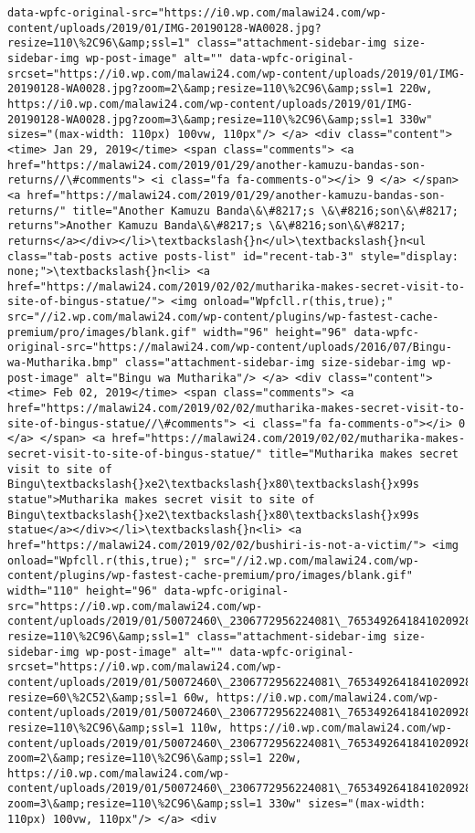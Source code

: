 \documentclass[11pt]{article}
\begin{document}
\begin{Verbatim}[commandchars=\\\{\}]
data-wpfc-original-src="https://i0.wp.com/malawi24.com/wp-content/uploads/2019/01/IMG-20190128-WA0028.jpg?resize=110\%2C96\&amp;ssl=1" class="attachment-sidebar-img size-sidebar-img wp-post-image" alt="" data-wpfc-original-srcset="https://i0.wp.com/malawi24.com/wp-content/uploads/2019/01/IMG-20190128-WA0028.jpg?zoom=2\&amp;resize=110\%2C96\&amp;ssl=1 220w, https://i0.wp.com/malawi24.com/wp-content/uploads/2019/01/IMG-20190128-WA0028.jpg?zoom=3\&amp;resize=110\%2C96\&amp;ssl=1 330w" sizes="(max-width: 110px) 100vw, 110px"/> </a> <div class="content"> <time> Jan 29, 2019</time> <span class="comments"> <a href="https://malawi24.com/2019/01/29/another-kamuzu-bandas-son-returns//\#comments"> <i class="fa fa-comments-o"></i> 9 </a> </span> <a href="https://malawi24.com/2019/01/29/another-kamuzu-bandas-son-returns/" title="Another Kamuzu Banda\&\#8217;s \&\#8216;son\&\#8217; returns">Another Kamuzu Banda\&\#8217;s \&\#8216;son\&\#8217; returns</a></div></li>\textbackslash{}n</ul>\textbackslash{}n<ul class="tab-posts active posts-list" id="recent-tab-3" style="display: none;">\textbackslash{}n<li> <a href="https://malawi24.com/2019/02/02/mutharika-makes-secret-visit-to-site-of-bingus-statue/"> <img onload="Wpfcll.r(this,true);" src="//i2.wp.com/malawi24.com/wp-content/plugins/wp-fastest-cache-premium/pro/images/blank.gif" width="96" height="96" data-wpfc-original-src="https://malawi24.com/wp-content/uploads/2016/07/Bingu-wa-Mutharika.bmp" class="attachment-sidebar-img size-sidebar-img wp-post-image" alt="Bingu wa Mutharika"/> </a> <div class="content"> <time> Feb 02, 2019</time> <span class="comments"> <a href="https://malawi24.com/2019/02/02/mutharika-makes-secret-visit-to-site-of-bingus-statue//\#comments"> <i class="fa fa-comments-o"></i> 0 </a> </span> <a href="https://malawi24.com/2019/02/02/mutharika-makes-secret-visit-to-site-of-bingus-statue/" title="Mutharika makes secret visit to site of Bingu\textbackslash{}xe2\textbackslash{}x80\textbackslash{}x99s statue">Mutharika makes secret visit to site of Bingu\textbackslash{}xe2\textbackslash{}x80\textbackslash{}x99s statue</a></div></li>\textbackslash{}n<li> <a href="https://malawi24.com/2019/02/02/bushiri-is-not-a-victim/"> <img onload="Wpfcll.r(this,true);" src="//i2.wp.com/malawi24.com/wp-content/plugins/wp-fastest-cache-premium/pro/images/blank.gif" width="110" height="96" data-wpfc-original-src="https://i0.wp.com/malawi24.com/wp-content/uploads/2019/01/50072460\_2306772956224081\_7653492641841020928\_n.jpg?resize=110\%2C96\&amp;ssl=1" class="attachment-sidebar-img size-sidebar-img wp-post-image" alt="" data-wpfc-original-srcset="https://i0.wp.com/malawi24.com/wp-content/uploads/2019/01/50072460\_2306772956224081\_7653492641841020928\_n.jpg?resize=60\%2C52\&amp;ssl=1 60w, https://i0.wp.com/malawi24.com/wp-content/uploads/2019/01/50072460\_2306772956224081\_7653492641841020928\_n.jpg?resize=110\%2C96\&amp;ssl=1 110w, https://i0.wp.com/malawi24.com/wp-content/uploads/2019/01/50072460\_2306772956224081\_7653492641841020928\_n.jpg?zoom=2\&amp;resize=110\%2C96\&amp;ssl=1 220w, https://i0.wp.com/malawi24.com/wp-content/uploads/2019/01/50072460\_2306772956224081\_7653492641841020928\_n.jpg?zoom=3\&amp;resize=110\%2C96\&amp;ssl=1 330w" sizes="(max-width: 110px) 100vw, 110px"/> </a> <div 
\end{Verbatim}
\end{document}
